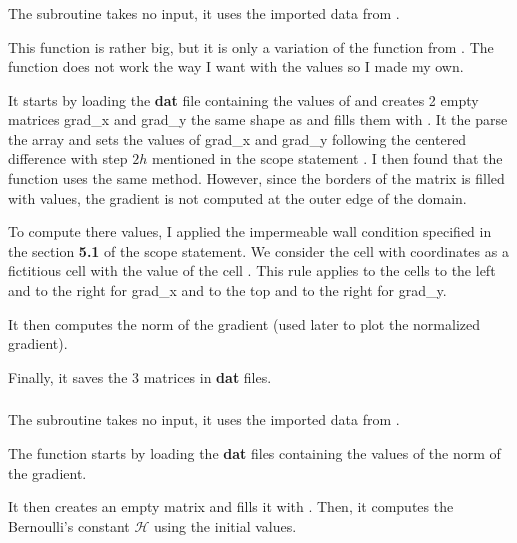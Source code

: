 \subsubsection{\textcolor{func}{}}
The subroutine \textcolor{func}{} takes no input, it uses the imported data
from .

This function is rather big, but it is only a variation of the 
function from . The function  does not work
the way I want with the  values so I made my own.

It starts by loading the \textbf{dat} file containing the values of 
and creates 2 empty matrices grad\_x and grad\_y the same shape as
 and fills them with . It the parse the 
array and sets the values of grad\_x and grad\_y following the centered
difference with step $2h$ mentioned in the scope statement
\cite{scope-statement}. I then found that the function  uses
the same method. However, since the borders of the matrix  is filled
with  values, the gradient is not computed at the outer edge of
the domain.

To compute there values, I applied the impermeable wall condition specified in
the section \textbf{5.1} of the scope statement. We consider the 
 cell with coordinates \py{[i - 1, j]} as a fictitious cell with
the value of the cell \py{[i, j]}. This rule applies to the cells to the left
and to the right for grad\_x and to the top and to the right for grad\_y.

It then computes the norm of the gradient (used later to plot the normalized
gradient).

Finally, it saves the 3 matrices in \textbf{dat} files.

\subsubsection{\textcolor{func}{}}
The subroutine  takes no input, it uses the imported data
from .

The function starts by loading the \textbf{dat} files containing the values of
the norm of the gradient.

It then creates an empty matrix  and fills it with .
Then, it computes the Bernoulli's constant $\mathcal{H}$ using the initial
values.

